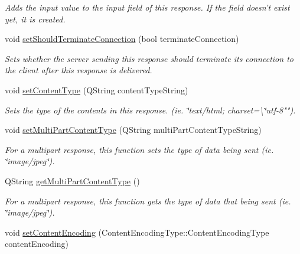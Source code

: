 \begin{DoxyCompactItemize}
\begin{DoxyCompactList}\small\item\em Adds the input value to the input field of this response. If the field doesn't exist yet, it is created. \end{DoxyCompactList}\item 
\hypertarget{struct_picto_1_1_protocol_response_aaaeb043be858c4675cb4e0bbcf65edc5}{void \hyperlink{struct_picto_1_1_protocol_response_aaaeb043be858c4675cb4e0bbcf65edc5}{set\-Should\-Terminate\-Connection} (bool terminate\-Connection)}\label{struct_picto_1_1_protocol_response_aaaeb043be858c4675cb4e0bbcf65edc5}

\begin{DoxyCompactList}\small\item\em Sets whether the server sending this response should terminate its connection to the client after this response is delivered. \end{DoxyCompactList}\item 
\hypertarget{struct_picto_1_1_protocol_response_a2df0c477e8ced59318846c2c100ff90f}{void \hyperlink{struct_picto_1_1_protocol_response_a2df0c477e8ced59318846c2c100ff90f}{set\-Content\-Type} (Q\-String content\-Type\-String)}\label{struct_picto_1_1_protocol_response_a2df0c477e8ced59318846c2c100ff90f}

\begin{DoxyCompactList}\small\item\em Sets the type of the contents in this response. (ie. \char`\"{}text/html; charset=\textbackslash{}\char`\"{}utf-\/8""). \end{DoxyCompactList}\item 
void \hyperlink{struct_picto_1_1_protocol_response_a4bceedb58f5729094946451616292c2a}{set\-Multi\-Part\-Content\-Type} (Q\-String multi\-Part\-Content\-Type\-String)
\begin{DoxyCompactList}\small\item\em For a multipart response, this function sets the type of data being sent (ie. \char`\"{}image/jpeg\char`\"{}). \end{DoxyCompactList}\item 
Q\-String \hyperlink{struct_picto_1_1_protocol_response_aa3f7376e9eef615d0e069d4fe56f7a09}{get\-Multi\-Part\-Content\-Type} ()
\begin{DoxyCompactList}\small\item\em For a multipart response, this function gets the type of data that being sent (ie. \char`\"{}image/jpeg\char`\"{}). \end{DoxyCompactList}\item 
\hypertarget{struct_picto_1_1_protocol_response_a9f6913c5490b7dfde04aef40be040cd5}{void \hyperlink{struct_picto_1_1_protocol_response_a9f6913c5490b7dfde04aef40be040cd5}{set\-Content\-Encoding} (Content\-Encoding\-Type\-::\-Content\-Encoding\-Type content\-Encoding)}\label{struct_picto_1_1_protocol_response_a9f6913c5490b7dfde04aef40be040cd5}


\end{DoxyCompactItemize}
